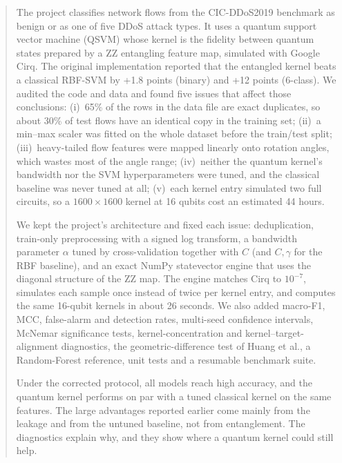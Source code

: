 \documentclass[11pt,a4paper]{article}
\begin{document}
\begin{abstract}
\noindent
The project classifies network flows from the CIC-DDoS2019 benchmark as benign or as one of
five DDoS attack types. It uses a quantum support vector machine (QSVM) whose kernel is the
fidelity between quantum states prepared by a ZZ entangling feature map, simulated with
Google Cirq. The original implementation reported that the entangled kernel beats a classical
RBF-SVM by +1.8 points (binary) and +12 points (6-class). We audited the code and data and
found five issues that affect those conclusions: (i)~65\% of the rows in the data file are exact
duplicates, so about 30\% of test flows have an identical copy in the training set; (ii)~a
min--max scaler was fitted on the whole dataset before the train/test split; (iii)~heavy-tailed
flow features were mapped linearly onto rotation angles, which wastes most of the angle range;
(iv)~neither the quantum kernel's bandwidth nor the SVM hyperparameters were tuned, and the
classical baseline was never tuned at all; (v)~each kernel entry simulated two full circuits,
so a $1600\times1600$ kernel at 16 qubits cost an estimated 44 hours.

We kept the project's architecture and fixed each issue: deduplication, train-only
preprocessing with a signed log transform, a bandwidth parameter $\alpha$ tuned by
cross-validation together with $C$ (and $C,\gamma$ for the RBF baseline), and an exact
NumPy statevector engine that uses the diagonal structure of the ZZ map. The engine matches
Cirq to $10^{-7}$, simulates each sample once instead of twice per kernel entry, and computes
the same 16-qubit kernels in about 26 seconds. We also added macro-F1, MCC, false-alarm and
detection rates, multi-seed confidence intervals, McNemar significance tests, kernel-concentration
and kernel--target-alignment diagnostics, the geometric-difference test of Huang et al., a
Random-Forest reference, unit tests and a resumable benchmark suite.

Under the corrected protocol, all models reach high accuracy, and the quantum kernel performs
on par with a tuned classical kernel on the same features. The large advantages reported earlier
come mainly from the leakage and from the untuned baseline, not from entanglement. The
diagnostics explain why, and they show where a quantum kernel could still help.
\end{abstract}

\clearpage
\tableofcontents
\clearpage











\appendix


\end{document}
